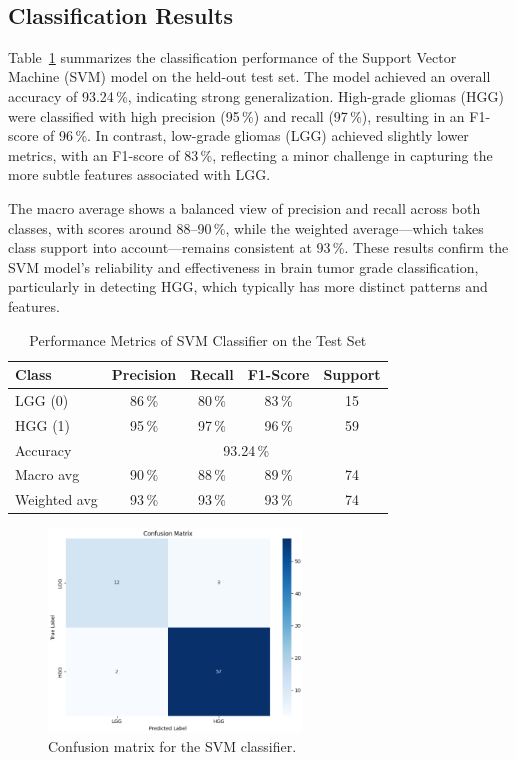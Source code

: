 \newpage\
\subsection{Classification Results}
\label{sec:classification-results}

Table~\ref{tab:svm-report} summarizes the classification performance of the Support Vector Machine (SVM) model on the held-out test set. The model achieved an overall accuracy of 93.24\,\%, indicating strong generalization. High-grade gliomas (HGG) were classified with high precision (95\,\%) and recall (97\,\%), resulting in an F1-score of 96\,\%. In contrast, low-grade gliomas (LGG) achieved slightly lower metrics, with an F1-score of 83\,\%, reflecting a minor challenge in capturing the more subtle features associated with LGG.

The macro average shows a balanced view of precision and recall across both classes, with scores around 88–90\,\%, while the weighted average—which takes class support into account—remains consistent at 93\,\%. These results confirm the SVM model's reliability and effectiveness in brain tumor grade classification, particularly in detecting HGG, which typically has more distinct patterns and features.

\begin{table}[ht]
  \centering
  \caption{Performance Metrics of SVM Classifier on the Test Set}
  \label{tab:svm-report}
  \begin{tabular}{lcccc}
    \hline
    Class        & Precision                     & Recall & F1-Score & Support \\
    \hline
    LGG (0)      & 86\,\%                        & 80\,\% & 83\,\%   & 15      \\
    HGG (1)      & 95\,\%                        & 97\,\% & 96\,\%   & 59      \\
    \hline
    Accuracy     & \multicolumn{4}{c}{93.24\,\%}                               \\
    Macro avg    & 90\,\%                        & 88\,\% & 89\,\%   & 74      \\
    Weighted avg & 93\,\%                        & 93\,\% & 93\,\%   & 74      \\
    \hline
  \end{tabular}
\end{table}

\begin{figure}[H]
  \centering
  \includegraphics[width=0.6\textwidth]{Images/Chapter3/confusion.png}
  \caption{Confusion matrix for the SVM classifier.}
  \label{fig:confusion}
\end{figure}


